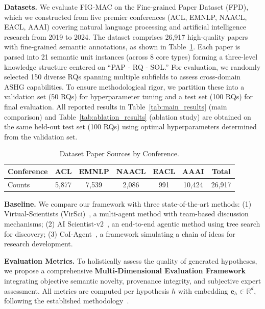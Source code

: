 \documentclass[runningheads]{llncs}
\begin{document}
\textbf{Datasets.} We evaluate FIG-MAC on the Fine-grained Paper Dataset (FPD), which we constructed from five premier conferences (ACL, EMNLP, NAACL, EACL, AAAI) covering natural language processing and artificial intelligence research from 2019 to 2024. The dataset comprises 26,917 high-quality papers with fine-grained semantic annotations, as shown in Table~\ref{tab:dataset_sources}. Each paper is parsed into 21 semantic unit instances (across 8 core types) forming a three-level knowledge structure centered on ``PAP - RQ - SOL.'' For evaluation, we randomly selected 150 diverse RQs spanning multiple subfields to assess cross-domain ASHG capabilities. To ensure methodological rigor, we partition these into a validation set (50 RQs) for hyperparameter tuning and a test set (100 RQs) for final evaluation. All reported results in Table~\ref{tab:main_results} (main comparison) and Table~\ref{tab:ablation_results} (ablation study) are obtained on the same held-out test set (100 RQs) using optimal hyperparameters determined from the validation set.

\begin{table}[t]
\centering
\small
\begin{tabular}{lcccccc}
\toprule
\textbf{Conference} & ACL & EMNLP & NAACL & EACL & AAAI & \textbf{Total} \\
\midrule
Counts & 5,877 & 7,539 & 2,086 & 991 & 10,424 & 26,917 \\
\bottomrule
\end{tabular}
\caption{Dataset Paper Sources by Conference.}
\label{tab:dataset_sources}
\end{table}

\textbf{Baseline.} We compare our framework with three state-of-the-art methods: (1) Virtual-Scientists (VirSci)~\cite{DBLP:journals/corr/abs-2410-09403}, a multi-agent method with team-based discussion mechanisms; (2) AI Scientist-v2~\cite{DBLP:journals/corr/abs-2408-06292}, an end-to-end agentic method using tree search for discovery; (3) CoI-Agent~\cite{li2024chain}, a framework simulating a chain of ideas for research development.

\textbf{Evaluation Metrics.} To holistically assess the quality of generated hypotheses, we propose a comprehensive \textbf{Multi-Dimensional Evaluation Framework} integrating objective semantic novelty, provenance integrity, and subjective expert assessment. All metrics are computed per hypothesis $h$ with embedding $\mathbf{e}_h \in \mathbb{R}^d$, following the established methodology~\cite{su2025many}.
\end{document}
